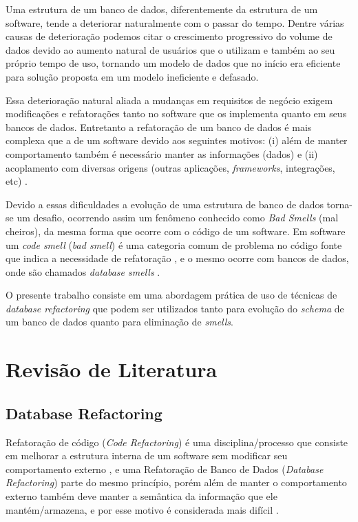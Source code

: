 \documentclass[10pt]{article}
\begin{document}
	Uma estrutura de um banco de dados, diferentemente da estrutura de um software, tende a deteriorar naturalmente com o passar do tempo. Dentre várias causas de deterioração podemos citar o crescimento progressivo do volume de dados devido ao aumento natural de usuários que o utilizam e também ao seu próprio tempo de uso, tornando um modelo de dados que no início era eficiente para solução proposta em um modelo ineficiente e defasado.

	Essa deterioração natural aliada a mudanças em requisitos de negócio exigem modificações e refatorações tanto no software que os implementa quanto em seus bancos de dados. Entretanto a refatoração de um banco de dados é mais complexa que a de um software devido aos seguintes motivos: (i) além de manter comportamento também é necessário manter as informações (dados) e (ii) acoplamento com diversas origens (outras aplicações, \textit{frameworks}, integrações, etc) \cite{Ambler:RefactoringDatabases}.

	Devido a essas dificuldades a evolução de uma estrutura de banco de dados torna-se um desafio, ocorrendo assim um fenômeno conhecido como \textit{Bad Smells} (mal cheiros), da mesma forma que ocorre com o código de um software. Em software um \textit{code smell} (\textit{bad smell}) é uma categoria comum de problema no código fonte que indica a necessidade de refatoração \cite{Fowler:Refatoracao}, e o mesmo ocorre com bancos de dados, onde são chamados \textit{database smells} \cite{Ambler:RefactoringDatabases}.

	O presente trabalho consiste em uma abordagem prática de uso de técnicas de \textit{database refactoring} que podem ser utilizados tanto para evolução do \textit{schema} de um banco de dados quanto para eliminação de \textit{smells}.


\section{Revisão de Literatura}\label{sec:revliteratura}

\subsection{Database Refactoring}\label{subsec:databaserefactoring}
	Refatoração de código (\textit{Code Refactoring}) é uma disciplina/processo que consiste em melhorar a estrutura interna de um software sem modificar seu comportamento externo \cite{Fowler:Refatoracao}, e uma Refatoração de Banco de Dados (\textit{Database Refactoring}) parte do mesmo princípio, porém além de manter o comportamento externo também deve manter a semântica da informação que ele mantém/armazena, e por esse motivo é considerada mais difícil \cite{Ambler:RefactoringDatabases}.
\end{document}
